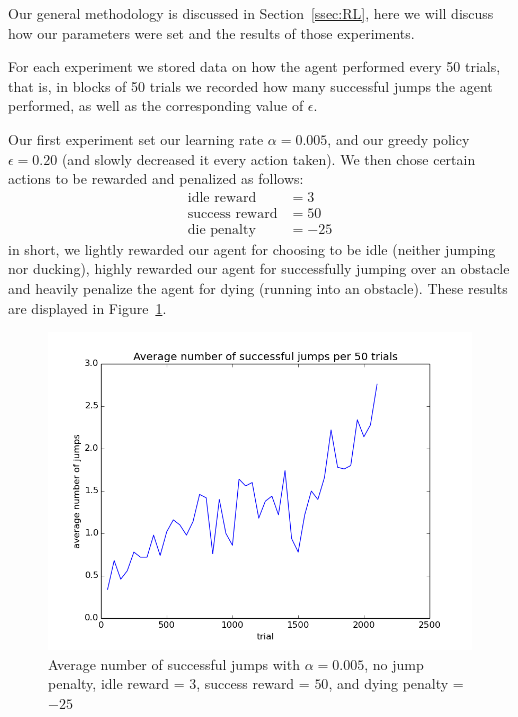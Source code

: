 \documentclass{scrartcl}
\begin{document}
    Our general methodology is discussed in Section~\ref{ssec:RL}, here we will
    discuss how our parameters were set and the results of those experiments.

    For each experiment we stored data on how the agent performed every 50
    trials, that is, in blocks of 50 trials we recorded how many successful
    jumps the agent performed, as well as the corresponding value of
    $\epsilon$.

    Our first experiment set our learning rate $\alpha = 0.005$, and our
    greedy policy $\epsilon = 0.20$ (and slowly decreased it every action
    taken). We then chose certain actions to be rewarded and penalized as
    follows:
    \begin{align*}
        \text{idle reward} &= 3\\
        \text{success reward} &= 50\\
        \text{die penalty} & = -25
    \end{align*}
    in short, we lightly rewarded our agent for choosing to be idle (neither
    jumping nor ducking), highly rewarded our agent for successfully jumping
    over an obstacle and heavily penalize the agent for dying (running into an
    obstacle). These results are displayed in Figure~\ref{fig:exp1}.

    \begin{figure}[H]
        \centering
        \includegraphics[width=\textwidth]{../avgJumps1}
        \caption{Average number of successful jumps with $\alpha = 0.005$, no
        jump penalty, idle reward = $3$, success reward = $50$, and dying
        penalty = $-25$}
        \label{fig:exp1}
    \end{figure}
\end{document}

